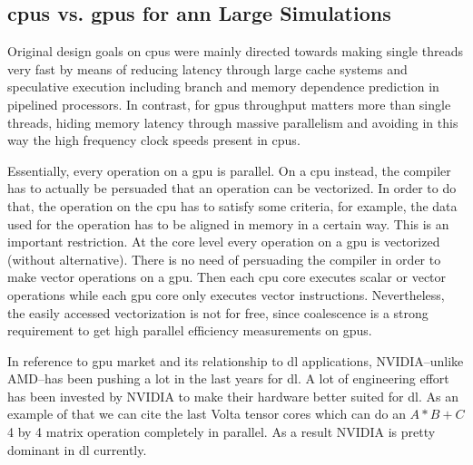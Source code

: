 \documentclass[10pt,journal,compsoc]{IEEEtran}
\begin{document}
\subsection{\glspl{cpu} vs. \glspl{gpu} for \gls{ann} Large Simulations}

Original design goals on \glspl{cpu} were mainly directed towards making single threads very fast by means of reducing latency through large cache systems and speculative execution including branch and memory dependence prediction in pipelined processors. In contrast, for \glspl{gpu} throughput matters more than single threads, hiding memory latency through massive parallelism and avoiding in this way the high frequency clock speeds present in \glspl{cpu}.

Essentially, every operation on a \gls{gpu} is parallel. On a \gls{cpu} instead, the compiler has to actually be persuaded that an operation can be vectorized. In order to do that, the operation on the \gls{cpu} has to satisfy some criteria, for example, the data used for the operation has to be aligned in memory in a certain way. This is an important restriction. At the core level every operation on a \gls{gpu} is vectorized (without alternative). There is no need of persuading the compiler in order to make vector operations on a \gls{gpu}. Then each \gls{cpu} core executes scalar or vector operations while each \gls{gpu} core only executes vector instructions. Nevertheless, the easily accessed vectorization is not for free, since coalescence is a strong requirement to get high parallel efficiency measurements on \glspl{gpu}.

In reference to \gls{gpu} market and its relationship to \gls{dl} applications, NVIDIA--unlike AMD--has been pushing a lot in the last years for \gls{dl}. A lot of engineering effort has been invested by NVIDIA to make their hardware better suited for \gls{dl}. As an example of that we can cite the last Volta tensor cores which can do an $A*B+C$ 4 by 4 matrix operation completely in parallel. As a result NVIDIA is pretty dominant in \gls{dl} currently.
\end{document}
